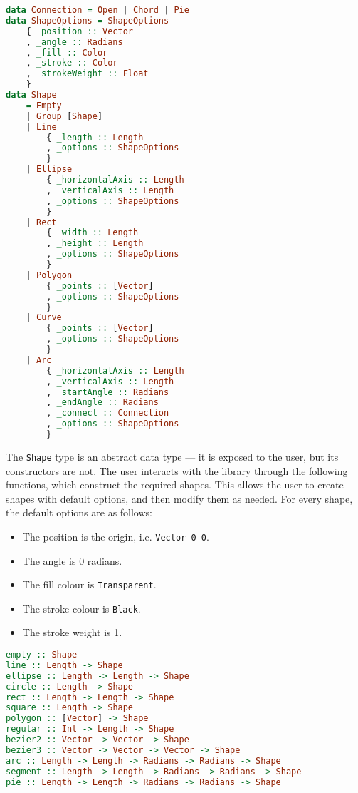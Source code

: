 \documentclass[../main.tex]{subfiles}
\begin{document}
                \begin{lstlisting}[language={Haskell}, label={lst:shape}, caption={The \texttt{Shape} type definition.}]
data Connection = Open | Chord | Pie
data ShapeOptions = ShapeOptions
    { _position :: Vector
    , _angle :: Radians
    , _fill :: Color
    , _stroke :: Color
    , _strokeWeight :: Float
    }
data Shape
    = Empty
    | Group [Shape]
    | Line
        { _length :: Length
        , _options :: ShapeOptions
        }
    | Ellipse
        { _horizontalAxis :: Length
        , _verticalAxis :: Length
        , _options :: ShapeOptions
        }
    | Rect
        { _width :: Length
        , _height :: Length
        , _options :: ShapeOptions
        }
    | Polygon
        { _points :: [Vector]
        , _options :: ShapeOptions
        }
    | Curve
        { _points :: [Vector]
        , _options :: ShapeOptions
        }
    | Arc
        { _horizontalAxis :: Length
        , _verticalAxis :: Length
        , _startAngle :: Radians
        , _endAngle :: Radians
        , _connect :: Connection
        , _options :: ShapeOptions
        }\end{lstlisting}

                The \texttt{Shape} type is an abstract data type — it is exposed to the user,
                    but its constructors are not.
                The user interacts with the library through the following functions, which
                    construct the required shapes.
                This allows the user to create shapes with default options, and then modify
                    them as needed.
                For every shape, the default options are as follows:
                \begin{itemize}
                    \item The position is the origin, i.e. \texttt{Vector 0 0}.
                    \item The angle is 0 radians.
                    \item The fill colour is \texttt{Transparent}.
                    \item The stroke colour is \texttt{Black}.
                    \item The stroke weight is 1.
                \end{itemize}

                \begin{lstlisting}[language={Haskell}, label={lst:shapes}, caption={The functions to create shapes.}]
empty :: Shape
line :: Length -> Shape
ellipse :: Length -> Length -> Shape
circle :: Length -> Shape
rect :: Length -> Length -> Shape
square :: Length -> Shape
polygon :: [Vector] -> Shape
regular :: Int -> Length -> Shape
bezier2 :: Vector -> Vector -> Shape
bezier3 :: Vector -> Vector -> Vector -> Shape
arc :: Length -> Length -> Radians -> Radians -> Shape
segment :: Length -> Length -> Radians -> Radians -> Shape
pie :: Length -> Length -> Radians -> Radians -> Shape\end{lstlisting}
\end{document}
